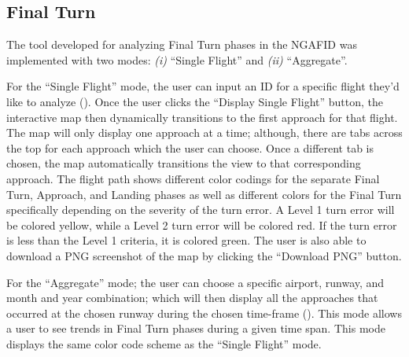     
    \subsection{Final Turn}
    
    	The tool developed for analyzing Final Turn phases in the NGAFID was implemented with two modes:  \textit{(i)} ``Single Flight'' and \textit{(ii)} ``Aggregate''.
    
    	For the ``Single Flight'' mode, the user can input an ID for a specific flight they'd like to analyze ().  Once the user clicks the ``Display Single Flight'' button, the interactive map then dynamically transitions to the first approach for that flight.  The map will only display one approach at a time; although, there are tabs across the top for each approach which the user can choose.  Once a different tab is chosen, the map automatically transitions the view to that corresponding approach.  The flight path shows different color codings for the separate Final Turn, Approach, and Landing phases as well as different colors for the Final Turn specifically depending on the severity of the turn error.  A Level 1 turn error will be colored yellow, while a Level 2 turn error will be colored red.  If the turn error is less than the Level 1 criteria, it is colored green.  The user is also able to download a PNG screenshot of the map by clicking the ``Download PNG'' button.
        
        For the ``Aggregate'' mode; the user can choose a specific airport, runway, and month and year combination; which will then display all the approaches that occurred at the chosen runway during the chosen time-frame ().  This mode allows a user to see trends in Final Turn phases during a given time span.  This mode displays the same color code scheme as the ``Single Flight'' mode.
    
